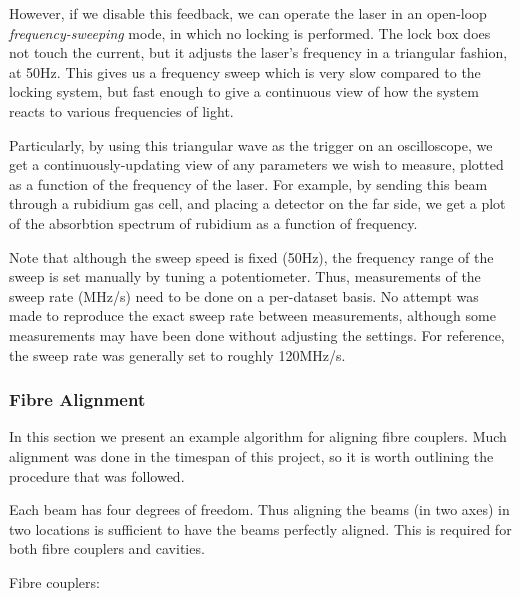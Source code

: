 However, if we disable this feedback, we can operate the laser in an open-loop \emph{frequency-sweeping} mode, in which no locking is performed.  The lock box does not touch the current, but it adjusts the laser's frequency in a triangular fashion, at 50Hz.  This gives us a frequency sweep which is very slow compared to the locking system, but fast enough to give a continuous view of how the system reacts to various frequencies of light.

Particularly, by using this triangular wave as the trigger on an oscilloscope, we get a continuously-updating view of any parameters we wish to measure, plotted as a function of the frequency of the laser.  For example, by sending this beam through a rubidium gas cell, and placing a detector on the far side, we get a plot of the absorbtion spectrum of rubidium as a function of frequency.

Note that although the sweep speed is fixed (50Hz), the frequency range of the sweep is set manually by tuning a potentiometer.  Thus, measurements of the sweep rate (MHz/s) need to be done on a per-dataset basis.  No attempt was made to reproduce the exact sweep rate between measurements, although some measurements may have been done without adjusting the settings.  For reference, the sweep rate was generally set to roughly 120MHz/s.

    \subsubsection{Fibre Alignment}

In this section we present an example algorithm for aligning fibre couplers.  Much alignment was done in the timespan of this project, so it is worth outlining the procedure that was followed.

Each beam has four degrees of freedom.  Thus aligning the beams (in two axes) in two locations is sufficient to have the beams perfectly aligned.  This is required for both fibre couplers and cavities.

Fibre couplers:

